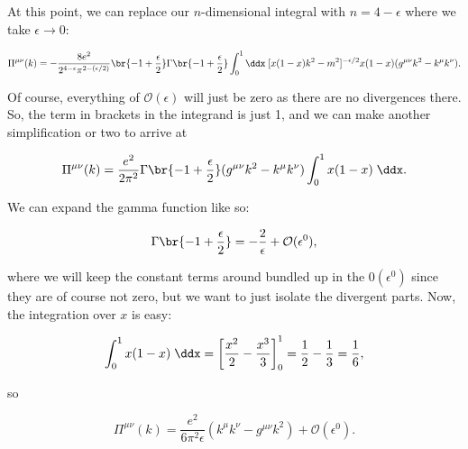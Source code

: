 \documentclass[titlepage]{article}
\begin{document}
At this point, we can replace our $n$-dimensional integral with $n=4-\epsilon$ where we take $\epsilon\rightarrow0$:

\begin{equation}
    \Pi^{\mu\nu}(k) = -\frac{8e^2}{2^{4-\epsilon} \pi^{2-(\epsilon/2)}} \br{-1 + \frac{\epsilon}{2}}\Gamma\br{-1 + \frac{\epsilon}{2}} \int_0^1 \ddx \; [x(1-x)k^2 - m^2]^{-\epsilon/2} x(1-x) (  g^{\mu\nu}k^2 - k^{\mu}k^{\nu} ).
\end{equation}

Of course, everything of $\mathcal{O}(\epsilon)$ will just be zero as there are no divergences there. So, the term in brackets in the integrand is just 1, and we can make another simplification or two to arrive at

\begin{equation}
    \Pi^{\mu\nu}(k) = \frac{e^2}{2\pi^2} \Gamma\br{-1 + \frac{\epsilon}{2}} (g^{\mu\nu}k^2 - k^{\mu}k^{\nu}) \int_0^1 x(1-x) \;\ddx.
\end{equation}

We can expand the gamma function like so:

\begin{equation}
    \Gamma\br{-1 + \frac{\epsilon}{2}} = -\frac{2}{\epsilon} + \mathcal{O}(\epsilon^0),
\end{equation}

where we will keep the constant terms around bundled up in the $\mathcal{0}(\epsilon^0)$ since they are of course not zero, but we want to just isolate the divergent parts. Now, the integration over $x$ is easy:

\begin{equation}
    \int_0^1 x(1-x) \;\ddx = \left[ \frac{x^2}{2} - \frac{x^3}{3} \right]^1_0 = \frac{1}{2} - \frac{1}{3} = \frac{1}{6},
\end{equation}

so

\begin{equation}
    \boxed{\Pi^{\mu\nu}(k) = \frac{e^2}{6\pi^2\epsilon}(k^{\mu}k^{\nu} - g^{\mu\nu}k^2) + \mathcal{O}(\epsilon^0).}
\end{equation}
\end{document}
